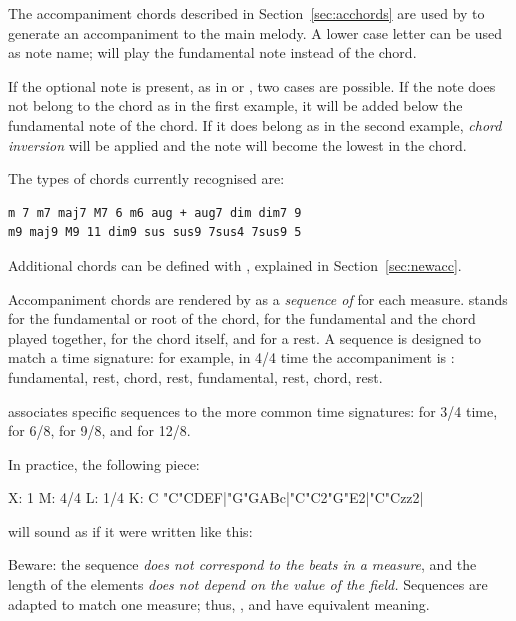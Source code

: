 \documentclass[a4paper,12pt]{book}
\begin{document}
The accompaniment chords described in Section~\ref{sec:acchords} are used
by \abcmid{} to generate an accompaniment to the main melody. A lower case
letter  can be used as note name; \abcmid{} will
play the fundamental note instead of the chord.

If the optional note is present, as in  or , two cases are
possible. If the note does not belong to the chord as in the first example,
it will be added below the fundamental note of the chord. If it does belong
as in the second example, \emph{chord inversion} will be applied and the
note will become the lowest in the chord.

The types of chords currently recognised are:

\begin{verbatim}
m 7 m7 maj7 M7 6 m6 aug + aug7 dim dim7 9
m9 maj9 M9 11 dim9 sus sus9 7sus4 7sus9 5
\end{verbatim}

Additional chords can be defined with ,
explained in Section~\ref{sec:newacc}.

Accompaniment chords are rendered by \abcmid{} as a \emph{sequence of
} for each measure.  stands for the fundamental or
root of the chord,  for the fundamental and the chord played
together,  for the chord itself, and  for a rest. A
 sequence is designed to match a time signature: for
example, in 4/4 time the accompaniment is : fundamental,
rest, chord, rest, fundamental, rest, chord, rest.

\abcmid{} associates specific  sequences to the more common
time signatures:  for 3/4 time,  for 6/8,
 for 9/8, and  for 12/8.

In practice, the following piece:

\begin{abcsource}
X: 1
M: 4/4
L: 1/4
K: C
%
"C"CDEF|"G"GABc|"C"C2"G"E2|"C"Czz2|
\end{abcsource}

will sound as if it were written like this:


Beware: the  sequence \emph{does not correspond to the beats
in a measure}, and the length of the elements \emph{does not depend on
the value of the  field.} Sequences are adapted to match one
measure; thus, ,  and  have
equivalent meaning.
\end{document}
